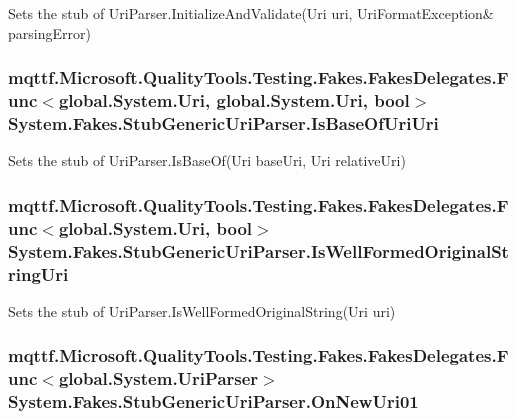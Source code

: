 Sets the stub of Uri\-Parser.\-Initialize\-And\-Validate(Uri uri, Uri\-Format\-Exception\& parsing\-Error)

\hypertarget{class_system_1_1_fakes_1_1_stub_generic_uri_parser_ab78cd68a8a0ce0b718abbb6d094a962f}{
\subsubsection[{Is\-Base\-Of\-Uri\-Uri}]{\setlength{\rightskip}{0pt plus 5cm}mqttf.\-Microsoft.\-Quality\-Tools.\-Testing.\-Fakes.\-Fakes\-Delegates.\-Func$<$global.\-System.\-Uri, global.\-System.\-Uri, bool$>$ System.\-Fakes.\-Stub\-Generic\-Uri\-Parser.\-Is\-Base\-Of\-Uri\-Uri}}\label{class_system_1_1_fakes_1_1_stub_generic_uri_parser_ab78cd68a8a0ce0b718abbb6d094a962f}


Sets the stub of Uri\-Parser.\-Is\-Base\-Of(\-Uri base\-Uri, Uri relative\-Uri)

\hypertarget{class_system_1_1_fakes_1_1_stub_generic_uri_parser_a9d9e498144cd5c44fdf0cfda1861524c}{
\subsubsection[{Is\-Well\-Formed\-Original\-String\-Uri}]{\setlength{\rightskip}{0pt plus 5cm}mqttf.\-Microsoft.\-Quality\-Tools.\-Testing.\-Fakes.\-Fakes\-Delegates.\-Func$<$global.\-System.\-Uri, bool$>$ System.\-Fakes.\-Stub\-Generic\-Uri\-Parser.\-Is\-Well\-Formed\-Original\-String\-Uri}}\label{class_system_1_1_fakes_1_1_stub_generic_uri_parser_a9d9e498144cd5c44fdf0cfda1861524c}


Sets the stub of Uri\-Parser.\-Is\-Well\-Formed\-Original\-String(\-Uri uri)

\hypertarget{class_system_1_1_fakes_1_1_stub_generic_uri_parser_a7ee6644b646ce08f8f0bdd3ae504e2e8}{
\subsubsection[{On\-New\-Uri01}]{\setlength{\rightskip}{0pt plus 5cm}mqttf.\-Microsoft.\-Quality\-Tools.\-Testing.\-Fakes.\-Fakes\-Delegates.\-Func$<$global.\-System.\-Uri\-Parser$>$ System.\-Fakes.\-Stub\-Generic\-Uri\-Parser.\-On\-New\-Uri01}}\label{class_system_1_1_fakes_1_1_stub_generic_uri_parser_a7ee6644b646ce08f8f0bdd3ae504e2e8}


